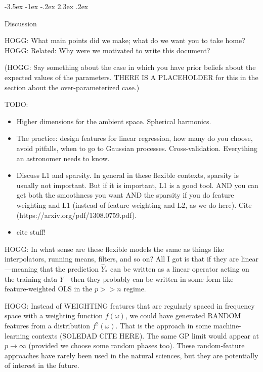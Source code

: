 \documentclass[12pt,letterpaper]{article}
\makeatletter
\renewcommand\section{\@startsection {section}{1}{\z@}%
  {-3.5ex \@plus -1ex \@minus -.2ex}%
  {2.3ex \@plus.2ex}%
  {\raggedright\normalfont\Large\bfseries}}
\makeatother
\begin{document}
\section{Discussion}\label{sec:discussion}

HOGG: What main points did we make; what do we want you to take home? HOGG: Related: Why were we motivated to write this document?

(HOGG: Say something about the case in which you have prior beliefs about the expected values of the parameters. THERE IS A PLACEHOLDER for this in the section about the over-parameterized case.)

TODO:
\begin{itemize}
    \item Higher dimensions for the ambient space. Spherical harmonics.
    \item The practice: design features for linear regression, how many do you choose, avoid pitfalls, when to go to Gaussian processes. Cross-validation. Everything an astronomer needs to know.
    \item Discuss L1 and sparsity. In general in these flexible contexts, sparsity is usually not important. But if it is important, L1 is a good tool. AND you can get both the smoothness you want AND the sparsity if you do feature weighting and L1 (instead of feature weighting and L2, as we do here). Cite (https://arxiv.org/pdf/1308.0759.pdf).
    \item cite stuff!
\end{itemize}

HOGG: In what sense are these flexible models the same as things like interpolators, running means, filters, and so on?
All I got is that if they are linear---meaning that the prediction $\hat{Y}_\ast$ can be written as a linear operator acting on the training data $Y$---then they probably can be written in some form like feature-weighted OLS in the $p>>n$ regime.

HOGG: Instead of WEIGHTING features that are regularly spaced in frequency space with a weighting function $f(\omega)$, we could have generated RANDOM features from a distribution $f^2(\omega)$.
That is the approach in some machine-learning contexts (SOLEDAD CITE HERE).
The same GP limit would appear at $p\rightarrow\infty$ (provided we choose some random phases too).
These random-feature approaches have rarely been used in the natural sciences, but they are potentially of interest in the future.

{\raggedright


}
\end{document}
